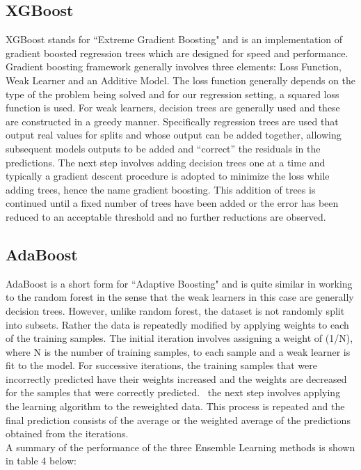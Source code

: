 \documentclass[12pt]{article}
\begin{document}
\subsection*{XGBoost}
XGBoost stands for ``Extreme Gradient Boosting" and is an implementation of gradient boosted regression trees which are designed for speed and performance. Gradient boosting framework generally involves three elements: Loss Function, Weak Learner and an Additive Model\cite{mastery}. The loss function generally depends on the type of the problem being solved and for our regression setting, a squared loss function is used. For weak learners, decision trees are generally used and these are constructed in a greedy manner. Specifically regression trees are used that output real values for splits and whose output can be added together, allowing subsequent models outputs to be added and “correct” the residuals in the predictions. The next step involves adding decision trees one at a time and typically a gradient descent procedure is adopted to minimize the loss while adding trees, hence the name gradient boosting. This addition of trees is continued until a fixed number of trees have been added or the error has been reduced to an acceptable threshold and no further reductions are observed.  

\subsection*{AdaBoost}
AdaBoost is a short form for ``Adaptive Boosting" and is quite similar in working to the random forest in the sense that the weak learners in this case are generally decision trees. However, unlike random forest, the dataset is not randomly split into subsets. Rather the data is repeatedly modified by applying weights to each of the training samples\cite{Sci}. The initial iteration involves assigning a weight of (1/N), where N is the number of training samples, to each sample and a weak learner is fit to the model. For successive iterations, the training samples that were incorrectly predicted have their weights increased and the weights are decreased for the samples that were correctly predicted. \ the next step involves applying the learning algorithm to the reweighted data. This process is repeated and the final prediction consists of the average or the weighted average of the predictions obtained from the iterations. 
\\

\noindent A summary of the performance of the three Ensemble Learning methods is shown in table 4 below:
\end{document}
